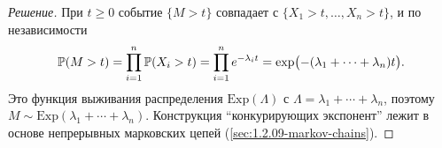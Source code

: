 \begin{proof}[Решение]
При $t \geq 0$ событие $\{M > t\}$ совпадает с $\{X_1 > t, \dots, X_n > t\}$, и по независимости
\[
  \mathbb{P}(M > t) = \prod_{i=1}^{n} \mathbb{P}(X_i > t) = \prod_{i=1}^{n} e^{-\lambda_i t} = \exp\bigl(-(\lambda_1 + \cdots + \lambda_n) t\bigr).
\]
Это функция выживания распределения $\mathrm{Exp}(\Lambda)$ с $\Lambda = \lambda_1 + \cdots + \lambda_n$, поэтому $M \sim \mathrm{Exp}(\lambda_1 + \cdots + \lambda_n)$. Конструкция ``конкурирующих экспонент'' лежит в основе непрерывных марковских цепей (\cref{sec:1.2.09-markov-chains}).
\end{proof}

